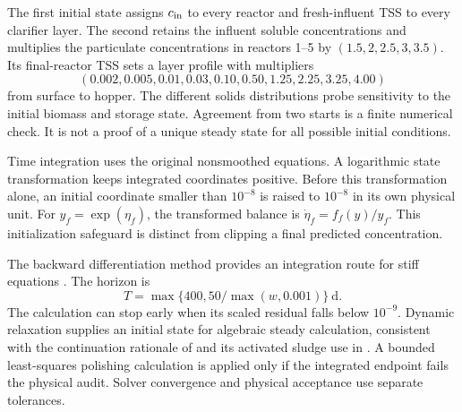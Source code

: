 The first initial state assigns $c_{\rm in}$ to every reactor and fresh-influent TSS to every clarifier layer. The second retains the influent soluble concentrations and multiplies the particulate concentrations in reactors 1--5 by $(1.5,2,2.5,3,3.5)$. Its final-reactor TSS sets a layer profile with multipliers
\begin{equation}
(0.002,0.005,0.01,0.03,0.10,0.50,1.25,2.25,3.25,4.00)
\label{eq:plant_initial_layer_multipliers}
\end{equation}
from surface to hopper. The different solids distributions probe sensitivity to the initial biomass and storage state. Agreement from two starts is a finite numerical check. It is not a proof of a unique steady state for all possible initial conditions.

Time integration uses the original nonsmoothed equations. A logarithmic state transformation keeps integrated coordinates positive. Before this transformation alone, an initial coordinate smaller than $10^{-8}$ is raised to $10^{-8}$ in its own physical unit. For $y_f=\exp(\eta_f)$, the transformed balance is $\dot\eta_f=f_f(y)/y_f$. This initialization safeguard is distinct from clipping a final predicted concentration.

The backward differentiation method provides an integration route for stiff equations \citep{CurtissHirschfelder1952}. The horizon is
\begin{equation}
T=\max\{400,50/\max(w,0.001)\}\ \mathrm{d}.
\label{eq:plant_integration_horizon}
\end{equation}
The calculation can stop early when its scaled residual falls below $10^{-9}$. Dynamic relaxation supplies an initial state for algebraic steady calculation, consistent with the continuation rationale of \citet{KelleyKeyes1998} and its activated sludge use in \citet{Selerio2026}. A bounded least-squares polishing calculation is applied only if the integrated endpoint fails the physical audit. Solver convergence and physical acceptance use separate tolerances.


